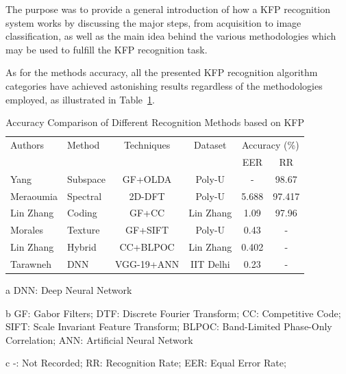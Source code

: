 \documentclass[journal]{IEEEtran}
\begin{document}
The purpose was to provide a general introduction of how a KFP recognition system works by discussing the major steps, from acquisition to image classification, as well as the main idea behind the various methodologies which may be used to fulfill the KFP recognition task.

As for the methods accuracy, all the presented KFP recognition algorithm categories have achieved astonishing results regardless of the methodologies employed, as illustrated in Table~\ref{tab:comparison}.

\begin{table}
\begin{threeparttable}
\caption{Accuracy Comparison of Different Recognition Methods based on KFP}
\label{tab:comparison}
\setlength\tabcolsep{0pt}

\begin{tabular*}{\columnwidth}{@{\extracolsep{\fill}} ll cccc}
\toprule
    Authors & Method\tnote{a} & Techniques\tnote{b} & Dataset &  \multicolumn{2}{c}{Accuracy (\%)}\tnote{c} \\ 
\cmidrule{5-6}
    & & & & EER & RR \\
\midrule
    Yang & Subspace & GF+OLDA & Poly-U & - & 98.67 \\
    Meraoumia & Spectral & 2D-DFT & Poly-U & 5.688 & 97.417 \\
\addlinespace
    Lin Zhang & Coding & GF+CC & Lin Zhang & 1.09 & 97.96 \\
    Morales & Texture & GF+SIFT & Poly-U & 0.43 & - \\
\addlinespace
    Lin Zhang & Hybrid & CC+BLPOC & Lin Zhang & 0.402 & - \\
\addlinespace
    Tarawneh & DNN & VGG-19+ANN & IIT Delhi & 0.23 & - \\
\bottomrule
\end{tabular*}

\smallskip
\scriptsize
\begin{tablenotes}
\RaggedRight
\item[a] DNN: Deep Neural Network

\item[b] GF: Gabor Filters; 
         DTF: Discrete Fourier Transform; 
         CC: Competitive Code;
         SIFT: Scale Invariant Feature Transform;
         BLPOC: Band-Limited Phase-Only Correlation;
         ANN: Artificial Neural Network

\item[c] -: Not Recorded;
         RR: Recognition Rate; 
         EER: Equal Error Rate; 
\end{tablenotes}
\end{threeparttable}
\end{table}
\end{document}
